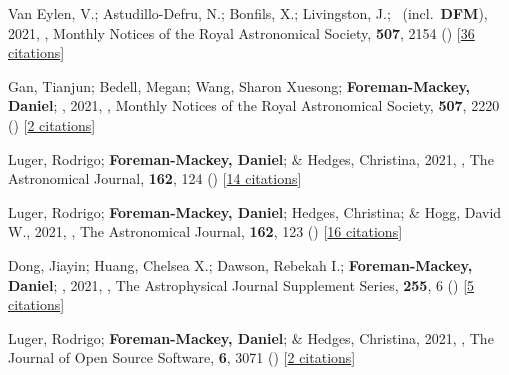 \item[{\color{numcolor}\scriptsize73}] Van Eylen, V.; Astudillo-Defru, N.; Bonfils, X.; Livingston, J.; \etal\ (incl.\ \textbf{DFM}), 2021, , Monthly Notices of the Royal Astronomical Society, \textbf{507}, 2154 () [\href{https://ui.adsabs.harvard.edu/abs/2021MNRAS.507.2154V}{36 citations}]

\item[{\color{numcolor}\scriptsize72}] Gan, Tianjun; Bedell, Megan; Wang, Sharon Xuesong; \textbf{Foreman-Mackey, Daniel}; \etal, 2021, , Monthly Notices of the Royal Astronomical Society, \textbf{507}, 2220 () [\href{https://ui.adsabs.harvard.edu/abs/2021MNRAS.507.2220G}{2 citations}]

\item[{\color{numcolor}\scriptsize71}] Luger, Rodrigo; \textbf{Foreman-Mackey, Daniel}; \& Hedges, Christina, 2021, , The Astronomical Journal, \textbf{162}, 124 () [\href{https://ui.adsabs.harvard.edu/abs/2021AJ....162..124L}{14 citations}]

\item[{\color{numcolor}\scriptsize70}] Luger, Rodrigo; \textbf{Foreman-Mackey, Daniel}; Hedges, Christina; \& Hogg, David W., 2021, , The Astronomical Journal, \textbf{162}, 123 () [\href{https://ui.adsabs.harvard.edu/abs/2021AJ....162..123L}{16 citations}]

\item[{\color{numcolor}\scriptsize69}] Dong, Jiayin; Huang, Chelsea X.; Dawson, Rebekah I.; \textbf{Foreman-Mackey, Daniel}; \etal, 2021, , The Astrophysical Journal Supplement Series, \textbf{255}, 6 () [\href{https://ui.adsabs.harvard.edu/abs/2021ApJS..255....6D}{5 citations}]

\item[{\color{numcolor}\scriptsize68}] Luger, Rodrigo; \textbf{Foreman-Mackey, Daniel}; \& Hedges, Christina, 2021, , The Journal of Open Source Software, \textbf{6}, 3071 () [\href{https://ui.adsabs.harvard.edu/abs/2021JOSS....6.3071L}{2 citations}]

